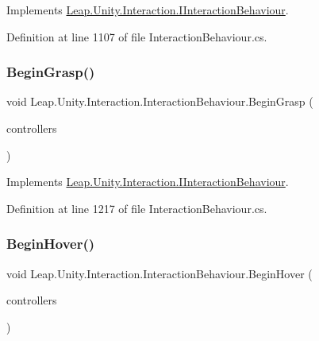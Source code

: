 Implements \mbox{\hyperlink{interface_leap_1_1_unity_1_1_interaction_1_1_i_interaction_behaviour_a577c47a20b0f2ae933bd20d7f1b47498}{Leap.\+Unity.\+Interaction.\+I\+Interaction\+Behaviour}}.



Definition at line 1107 of file Interaction\+Behaviour.\+cs.

\mbox{\label{class_leap_1_1_unity_1_1_interaction_1_1_interaction_behaviour_a96eca43283dfd825136e35345a4519f4}} 
\subsubsection{\texorpdfstring{BeginGrasp()}{BeginGrasp()}}
{\footnotesize\ttfamily void Leap.\+Unity.\+Interaction.\+Interaction\+Behaviour.\+Begin\+Grasp (\begin{DoxyParamCaption}\item[{List$<$ \mbox{\hyperlink{class_leap_1_1_unity_1_1_interaction_1_1_interaction_controller}{Interaction\+Controller}} $>$}]{controllers }\end{DoxyParamCaption})}



Implements \mbox{\hyperlink{interface_leap_1_1_unity_1_1_interaction_1_1_i_interaction_behaviour_af603fe6d03b61ae9e5d05c7809b05160}{Leap.\+Unity.\+Interaction.\+I\+Interaction\+Behaviour}}.



Definition at line 1217 of file Interaction\+Behaviour.\+cs.

\mbox{\label{class_leap_1_1_unity_1_1_interaction_1_1_interaction_behaviour_ac25c885f7c0d2ab121c60d1b3b5968c0}} 
\subsubsection{\texorpdfstring{BeginHover()}{BeginHover()}}
{\footnotesize\ttfamily void Leap.\+Unity.\+Interaction.\+Interaction\+Behaviour.\+Begin\+Hover (\begin{DoxyParamCaption}\item[{List$<$ \mbox{\hyperlink{class_leap_1_1_unity_1_1_interaction_1_1_interaction_controller}{Interaction\+Controller}} $>$}]{controllers }\end{DoxyParamCaption})}



